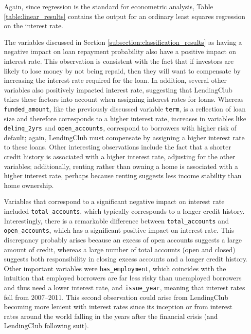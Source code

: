 \documentclass[12pt]{article}
\begin{document}
Again, since regression is the standard for econometric analysis, Table \ref{table:linear_results} contains the output for an ordinary least squares regression on the interest rate.

The variables discussed in Section \ref{subsection:classification_results} as having a negative impact on loan repayment probability also have a positive impact on interest rate. This observation is consistent with the fact that if investors are likely to lose money by not being repaid, then they will want to compensate by increasing the interest rate required for the loan. In addition, several other variables also positively impacted interest rate, suggesting that LendingClub takes these factors into account when assigning interest rates for loans.
Whereas \texttt{funded\_amount}, like the previously discussed variable \texttt{term}, is a reflection of loan size and therefore corresponds to a higher interest rate, increases in variables like \texttt{delinq\_2yrs} and \texttt{open\_accounts}, correspond to borrowers with higher risk of default; again, LendingClub must compensate by assigning a higher interest rate to these loans. Other interesting observations include the fact that a shorter credit history is associated with a higher interest rate, adjusting for the other variables; additionally, renting rather than owning a home is associated with a higher interest rate, perhaps because renting suggests less income stability than home ownership.

Variables that correspond to a significant negative impact on interest rate included \texttt{total\_accounts}, which typically corresponds to a longer credit history. Interestingly, there is a remarkable difference between \texttt{total\_accounts} and \texttt{open\_accounts}, which has a significant positive impact on interest rate. This discrepancy probably arises because an excess of open accounts suggests a large amount of credit, whereas a large number of total accounts (open and closed) suggests both responsibility in closing excess accounts and a longer credit history. Other important variables were \texttt{has\_employment}, which coincides with the intuition that employed borrowers are far less risky than unemployed borrowers and thus need a lower interest rate, and \texttt{issue\_year}, meaning that interest rates fell from 2007--2011. This second observation could arise from LendingClub becoming more lenient with interest rates since its inception or from interest rates around the world falling in the years after the financial crisis (and LendingClub following suit).
\end{document}

